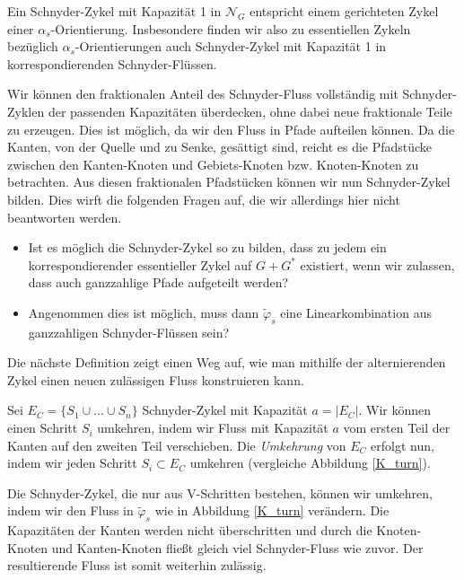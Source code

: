 Ein Schnyder-Zykel mit Kapazität 1 in $\mathcal{N}_G$ entspricht einem gerichteten Zykel einer $\alpha_s$-Orientierung. Insbesondere finden wir also zu essentiellen Zykeln bezüglich $\alpha_s$-Orientierungen auch Schnyder-Zykel mit Kapazität 1 in korrespondierenden Schnyder-Flüssen.

\begin{remark}
Wir können den fraktionalen Anteil des Schnyder-Fluss vollständig mit Schnyder-Zyklen der passenden Kapazitäten überdecken, ohne dabei neue fraktionale Teile zu erzeugen. Dies ist möglich, da wir den Fluss in Pfade aufteilen können. Da die Kanten, von der Quelle und zu Senke, gesättigt sind, reicht es die Pfadstücke zwischen den Kanten-Knoten und Gebiets-Knoten bzw. Knoten-Knoten zu betrachten. Aus diesen fraktionalen Pfadstücken können wir nun Schnyder-Zykel bilden. Dies wirft die folgenden Fragen auf, die wir allerdings hier nicht beantworten werden.

\begin{itemize}
\item Ist es möglich die Schnyder-Zykel so zu bilden, dass zu jedem ein korrespondierender essentieller Zykel auf $G+G^*$ existiert, wenn wir zulassen, dass auch ganzzahlige Pfade aufgeteilt werden?
\item Angenommen dies ist möglich, muss dann $\tilde{\varphi}_s$ eine Linearkombination aus ganzzahligen Schnyder-Flüssen sein?
\end{itemize}
\end{remark}

Die nächste Definition zeigt einen Weg auf, wie man mithilfe der alternierenden Zykel einen neuen zulässigen Fluss konstruieren kann.

\begin{definition}
Sei $E_C = \{S_1\cup \ldots \cup S_n\}$ Schnyder-Zykel mit Kapazität $a=|E_C|$. Wir können einen Schritt $S_i$ umkehren, indem wir Fluss mit Kapazität $a$ vom ersten Teil der Kanten auf den zweiten Teil verschieben. Die \textit{Umkehrung} von $E_C$ erfolgt nun, indem wir jeden Schritt $S_i \subset E_C$ umkehren (vergleiche Abbildung \ref{K_turn}).
\end{definition}

Die Schnyder-Zykel, die nur aus V-Schritten bestehen, können wir umkehren, indem wir den Fluss in $\tilde{\varphi}_s$ wie in Abbildung \ref{K_turn} verändern. Die Kapazitäten der Kanten werden nicht überschritten und durch die Knoten-Knoten und Kanten-Knoten fließt gleich viel Schnyder-Fluss wie zuvor. Der resultierende Fluss ist somit weiterhin zulässig.

